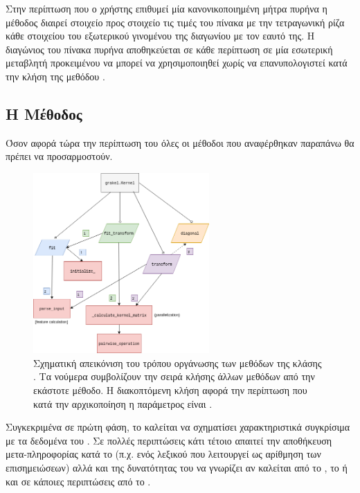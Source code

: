 Στην περίπτωση που ο χρήστης επιθυμεί μία κανονικοποιημένη μήτρα πυρήνα η μέθοδος \texttt{} διαιρεί στοιχείο προς στοιχείο τις τιμές του πίνακα με την τετραγωνική ρίζα κάθε στοιχείου του εξωτερικού γινομένου της διαγωνίου με τον εαυτό της.
Η διαγώνιος του πίνακα πυρήνα αποθηκεύεται σε κάθε περίπτωση σε μία εσωτερική μεταβλητή προκειμένου να μπορεί να χρησιμοποιηθεί χωρίς να επανυπολογιστεί κατά την κλήση της μεθόδου \texttt{}.
\subsection{Η Μέθοδος \texttt{}}
Όσον αφορά τώρα την περίπτωση του \texttt{} όλες οι μέθοδοι που αναφέρθηκαν παραπάνω θα πρέπει να προσαρμοστούν.
\begin{figure}[]
    \centering
    \includegraphics[width=0.6\textwidth]{figures/KernelStructure.png}
    \caption[Σχηματική απεικόνιση του τρόπου οργάνωσης των μεθόδων της κλάσης .]{Σχηματική απεικόνιση του τρόπου οργάνωσης των μεθόδων της κλάσης . Τα νούμερα συμβολίζουν την σειρά κλήσης άλλων μεθόδων από την εκάστοτε μέθοδο. Η διακοπτόμενη κλήση αφορά την περίπτωση που κατά την αρχικοποίηση η παράμετρος  είναι .}
    \label{fig:kernel_structure}
\end{figure}
Συγκεκριμένα σε πρώτη φάση, το \texttt{} καλείται να σχηματίσει χαρακτηριστικά συγκρίσιμα με τα δεδομένα του \texttt{}.
Σε πολλές περιπτώσεις κάτι τέτοιο απαιτεί την αποθήκευση μετα-πληροφορίας κατά το \texttt{} (π.χ. ενός λεξικού που λειτουργεί ως αρίθμηση των επισημειώσεων) αλλά και της δυνατότητας του \texttt{} να γνωρίζει αν καλείται από το \texttt{}, το \texttt{} ή και σε κάποιες περιπτώσεις από το \texttt{}.
